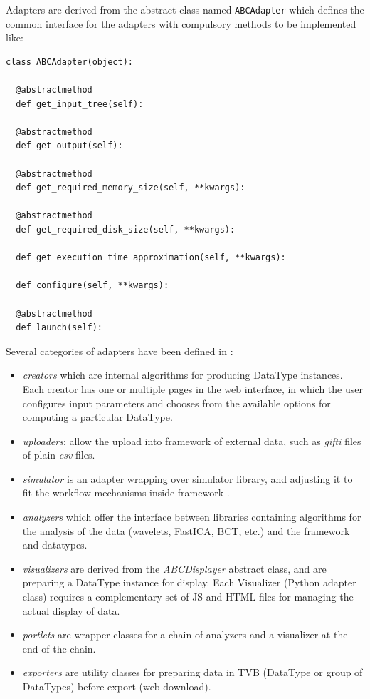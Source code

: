 Adapters are derived from the abstract class named \texttt{ABCAdapter} which
defines the common interface for the adapters with compulsory methods to be implemented like:

\begin{lstlisting}
class ABCAdapter(object):

  @abstractmethod
  def get_input_tree(self):

  @abstractmethod
  def get_output(self):

  @abstractmethod
  def get_required_memory_size(self, **kwargs):

  @abstractmethod
  def get_required_disk_size(self, **kwargs):

  def get_execution_time_approximation(self, **kwargs):

  def configure(self, **kwargs):

  @abstractmethod
  def launch(self):
\end{lstlisting}

Several categories of adapters have been defined in \TVB: 

\begin{itemize}
	\item \textit{creators} which are internal algorithms for producing DataType instances. 
		Each creator has one or multiple pages in the web interface, in which the user
		 configures input parameters and chooses from the available options for computing a particular DataType.

	\item \textit{uploaders}: allow the upload into \TVB framework of external data, 
    		such as \emph{gifti} files of plain \emph{csv} files.

	\item \textit{simulator} is an adapter wrapping over \TVB simulator library, and adjusting it to fit
		the workflow mechanisms inside \TVB framework .

	\item \textit{analyzers} which offer the interface between libraries containing algorithms 
		for the analysis of the data (wavelets, FastICA, BCT, etc.) and the \TVB framework and datatypes.

	\item \textit{visualizers} are derived from the \emph{ABCDisplayer} abstract class, and are preparing  
		a DataType instance for display. Each Visualizer (Python adapter class) requires a complementary set
		of JS and HTML files for managing the actual display of data.

	\item \textit{portlets} are wrapper classes for a chain of analyzers and a visualizer at the end of the chain.

	\item \textit{exporters} are utility classes for preparing data in TVB (DataType or group of DataTypes)
		before export (web download).
\end{itemize}

